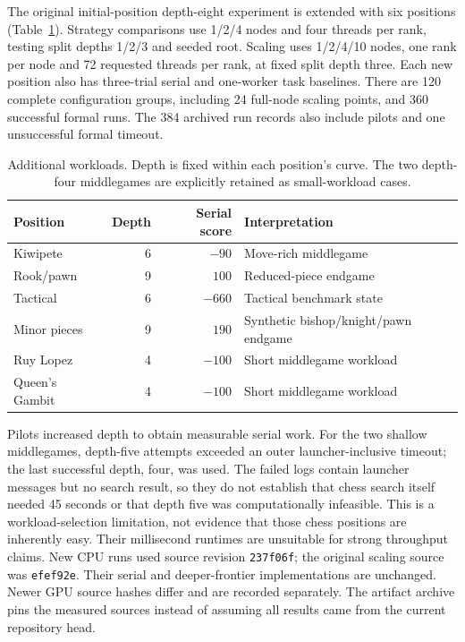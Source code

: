\documentclass[11pt,a4paper]{article}
\newcommand{\code}[1]{\texttt{#1}}
\begin{document}
The original initial-position depth-eight experiment is extended with six
positions (Table~\ref{tab:inputs}). Strategy comparisons use 1/2/4 nodes and
four threads per rank, testing split depths 1/2/3 and seeded root. Scaling uses
1/2/4/10 nodes, one rank per node and 72 requested threads per rank, at fixed
split depth three. Each new position also has three-trial serial and one-worker
task baselines. There are 120 complete configuration groups, including 24
full-node scaling points, and 360 successful formal runs. The 384 archived run
records also include pilots and one unsuccessful formal timeout.

\begin{table}[!htbp]\centering\small
\caption{Additional workloads. Depth is fixed within each position's curve.
The two depth-four middlegames are explicitly retained as small-workload cases.}
\label{tab:inputs}
\begin{tabular}{@{}lrrl@{}}\toprule
Position & Depth & Serial score & Interpretation \\\midrule
Kiwipete & 6 & $-90$ & Move-rich middlegame \\
Rook/pawn & 9 & $100$ & Reduced-piece endgame \\
Tactical & 6 & $-660$ & Tactical benchmark state \\
Minor pieces & 9 & $190$ & Synthetic bishop/knight/pawn endgame \\
Ruy Lopez & 4 & $-100$ & Short middlegame workload \\
Queen's Gambit & 4 & $-100$ & Short middlegame workload \\\bottomrule
\end{tabular}
\end{table}

Pilots increased depth to obtain measurable serial work. For the two shallow
middlegames, depth-five attempts exceeded an outer launcher-inclusive timeout;
the last successful depth, four, was used. The failed logs contain launcher
messages but no search result, so they do not establish that chess search itself
needed 45 seconds or that depth five was computationally infeasible. This
is a workload-selection limitation, not evidence that those chess positions are
inherently easy. Their millisecond runtimes are unsuitable for strong throughput
claims. New CPU runs used source revision \code{237f06f}; the original scaling
source was \code{efef92e}. Their serial and deeper-frontier implementations are
unchanged. Newer GPU source hashes differ and are recorded separately. The
artifact archive pins the measured sources instead of assuming all results
came from the current repository head.
\end{document}

